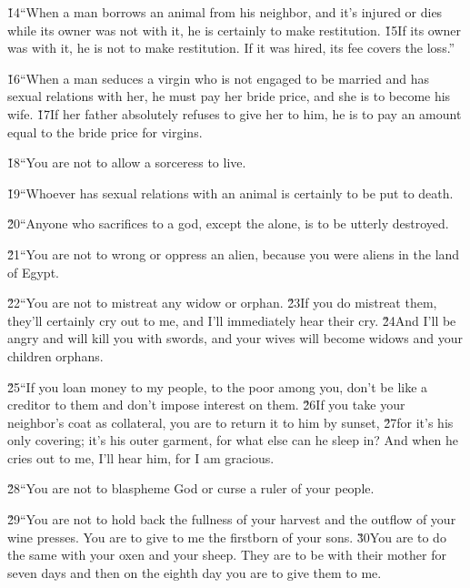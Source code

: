 \v{14}``When a man borrows an animal from his neighbor, and it's injured or dies while its owner was not with it, he is certainly to make restitution. \v{15}If its owner was with it, he is not to make restitution. If it was hired, its fee covers the loss.''

\v{16}``When a man seduces a virgin who is not engaged to be married and has sexual relations with her, he must pay her bride price, and she is to become his wife. \v{17}If her father absolutely refuses to give her to him, he is to pay an amount equal to the bride price for virgins.

\v{18}``You are not to allow a sorceress to live.

\v{19}``Whoever has sexual relations with an animal is certainly to be put to death.

\v{20}``Anyone who sacrifices to a god, except the  alone, is to be utterly destroyed.

\v{21}``You are not to wrong or oppress an alien, because you were aliens in the land of Egypt.

\v{22}``You are not to mistreat any widow or orphan. \v{23}If you do mistreat them, they'll certainly cry out to me, and I'll immediately hear their cry. \v{24}And I'll be angry and will kill you with swords, and your wives will become widows and your children orphans.

\v{25}``If you loan money to my people, to the poor among you, don't be like a creditor to them and don't impose interest on them. \v{26}If you take your neighbor's coat as collateral, you are to return it to him by sunset, \v{27}for it's his only covering; it's his outer garment, for what else can he sleep in? And when he cries out to me, I'll hear him, for I am gracious.

\v{28}``You are not to blaspheme God or curse a ruler of your people.

\v{29}``You are not to hold back the fullness of your harvest and the outflow of your wine presses. You are to give to me the firstborn of your sons. \v{30}You are to do the same with your oxen and your sheep. They are to be with their mother for seven days and then on the eighth day you are to give them to me.

